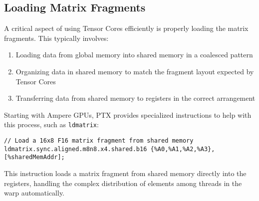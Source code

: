 \subsection{Loading Matrix Fragments}

A critical aspect of using Tensor Cores efficiently is properly loading the matrix fragments. This typically involves:

\begin{enumerate}
    \item Loading data from global memory into shared memory in a coalesced pattern
    \item Organizing data in shared memory to match the fragment layout expected by Tensor Cores
    \item Transferring data from shared memory to registers in the correct arrangement
\end{enumerate}

Starting with Ampere GPUs, PTX provides specialized instructions to help with this process, such as \texttt{ldmatrix}:

\begin{lstlisting}[style=ptx]
// Load a 16x8 F16 matrix fragment from shared memory
ldmatrix.sync.aligned.m8n8.x4.shared.b16 {%A0,%A1,%A2,%A3}, [%sharedMemAddr];
\end{lstlisting}

This instruction loads a matrix fragment from shared memory directly into the registers, handling the complex distribution of elements among threads in the warp automatically.

